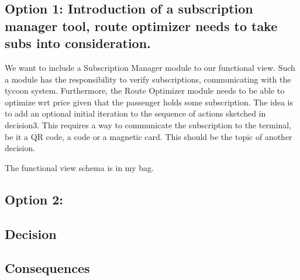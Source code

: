 \subsection*{Option 1: Introduction of a subscription manager tool, route optimizer needs to take subs into consideration.}
We want to include a Subscription Manager module to our functional view. 
Such a module has the responsibility to verify subscriptions, communicating with the tycoon system.
Furthermore, the Route Optimizer module needs to be able to optimize wrt price given that the passenger holds some subscription.
The idea is to add an optional initial iteration to the sequence of actions sketched in decision3.
This requires a way to communicate the subscription to the terminal, be it a QR code, a code or a magnetic card. 
This should be the topic of another decision.

The functional view schema is in my bag.

\subsection*{Option 2: }


\subsection*{Decision}

\subsection*{Consequences}
